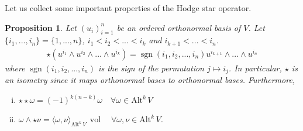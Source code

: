 \documentclass[12pt,a4paper]{article}
\numberwithin{equation}{subsection}
\numberwithin{lemma}{subsection}
\newtheorem{proposition}[lemma]{Proposition}
\theoremstyle{definition}
\DeclareMathOperator{\sgn}{sgn}
\DeclareMathOperator{\vol}{vol}
\newcommand{\alternating}[2]{ {\text{Alt}^{#1}\,#2} }
\begin{document}
Let us collect some important properties of the Hodge star operator.
\begin{proposition}\label{prop:properties_hodge_star}
    Let $(u_i)_{i=1}^n$ be an ordered orthonormal basis of $V$. Let 
    $\{ i_1, ..., i_n \} = \{ 1, ..., n\}$, $i_1 < i_2 < ... < i_k$ and 
    $i_{k+1} < ... < i_n$.
    \begin{align}
        \star (u^{i_1} \wedge u^{i_2} \wedge ... \wedge u^{i_k})
        = \sgn(i_1,i_2,...,i_n) u^{i_{k+1}} \wedge ... \wedge u^{i_{n}}
        \label{eq:hodge_star_orthonormal_basis}
    \end{align}
    where $\sgn(i_1,i_2,...,i_n)$ 
    is the sign of the permutation $j \mapsto i_j$. In particular, 
    $\star$ is an isometry since it maps orthonormal bases to orthonormal 
    bases. Furthermore,
    \begin{enumerate}[(i)]
        \item $\star \star \omega = (-1)^{k(n-k)} \omega \quad \forall \omega 
            \in \alternating{k}{V}$
        \item $\omega \wedge \star \nu = \langle \omega, \nu \rangle
            _{\alternating{k}{V}}  \, \vol \quad \forall \omega, \nu \in \alternating{k}{V}$.     
    \end{enumerate}
\end{proposition}
\end{document}
